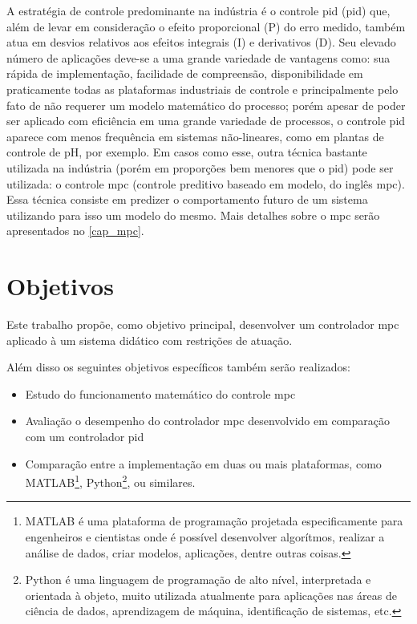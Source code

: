 A estratégia de controle predominante na indústria é o controle \acrshort{pid} (\acrlong{pid}) que, além de levar em consideração o efeito proporcional (P) do erro medido, também atua em desvios relativos aos efeitos integrais (I) e derivativos (D). Seu elevado número de aplicações deve-se a uma grande variedade de vantagens como: sua rápida de implementação, facilidade de compreensão, disponibilidade em praticamente todas as plataformas industriais de controle e principalmente pelo fato de não requerer um modelo matemático do processo; porém apesar de poder ser aplicado com eficiência em uma grande variedade de processos, o controle \acrshort{pid} aparece com menos frequência em sistemas não-lineares, como em plantas de controle de pH, por exemplo. Em casos como esse, outra técnica bastante utilizada na indústria (porém em proporções bem menores que o \acrshort{pid}) pode ser utilizada: o controle \acrshort{mpc} (controle preditivo baseado em modelo, do inglês \acrlong{mpc}). Essa técnica consiste em predizer o comportamento futuro de um sistema utilizando para isso um modelo do mesmo. Mais detalhes sobre o \acrshort{mpc} serão apresentados no \autoref{cap_mpc}.

\section{Objetivos}

Este trabalho propõe, como objetivo principal, desenvolver um controlador \acrshort{mpc} aplicado à um sistema didático com restrições de atuação.

Além disso os seguintes objetivos específicos também serão realizados:
\begin{itemize}
\item Estudo do funcionamento matemático do controle \acrshort{mpc}
\item Avaliação o desempenho do controlador \acrshort{mpc} desenvolvido em comparação com um controlador \acrshort{pid}
\item Comparação entre a implementação em duas ou mais plataformas, como MATLAB\textsuperscript{\tiny\textregistered}\footnote{MATLAB\textsuperscript{\tiny\textregistered} é uma plataforma de programação projetada especificamente para engenheiros e cientistas onde é possível desenvolver algorítmos, realizar a análise de dados, criar modelos, aplicações, dentre outras coisas.}, Python\footnote{Python é uma linguagem de programação de alto nível, interpretada e orientada à objeto, muito utilizada atualmente para aplicações nas áreas de ciência de dados, aprendizagem de máquina, identificação de sistemas, etc.}, ou similares.
\end{itemize}


